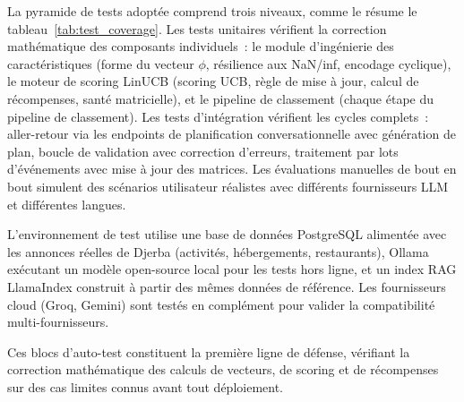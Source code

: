 La pyramide de tests adoptée comprend trois niveaux, comme le résume le tableau~\ref{tab:test_coverage}. Les tests unitaires vérifient la
correction mathématique des composants individuels~: le module d'ingénierie des caractéristiques (forme du vecteur
$\phi$, résilience aux NaN/inf, encodage cyclique), le moteur de scoring LinUCB (scoring UCB,
règle de mise à jour, calcul de récompenses, santé matricielle), et le pipeline de classement
(chaque étape du pipeline de classement). Les tests d'intégration vérifient les cycles
complets~: aller-retour via les endpoints de planification conversationnelle avec génération de plan, boucle de validation avec
correction d'erreurs, traitement par lots d'événements avec mise à jour des matrices. Les
évaluations manuelles de bout en bout simulent des scénarios utilisateur réalistes avec
différents fournisseurs LLM et différentes langues.

L'environnement de test utilise une base de données PostgreSQL alimentée avec les annonces
réelles de Djerba (activités, hébergements, restaurants), Ollama exécutant un modèle
open-source local pour les tests hors ligne, et un index RAG LlamaIndex construit à partir des mêmes
données de référence. Les fournisseurs cloud (Groq, Gemini) sont testés en complément pour
valider la compatibilité multi-fournisseurs.

Ces blocs d'auto-test constituent la première ligne de défense, vérifiant la correction
mathématique des calculs de vecteurs, de scoring et de récompenses sur des cas limites
connus avant tout déploiement.

